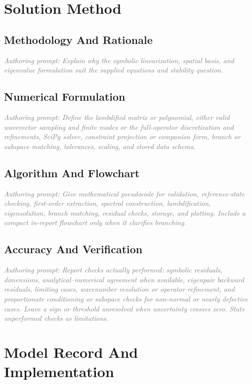 \documentclass[11pt]{article}
\newcommand{\authorprompt}[1]{\textcolor{gray}{\emph{Authoring prompt: #1}}}
\begin{document}
\section{Solution Method}

\subsection{Methodology And Rationale}

\authorprompt{Explain why the symbolic linearization, spatial basis, and eigenvalue formulation suit the supplied equations and stability question.}

\subsection{Numerical Formulation}

\authorprompt{Define the lambdified matrix or polynomial, either valid wavevector sampling and finite modes or the full-operator discretization and refinements, SciPy solver, constraint projection or companion form, branch or subspace matching, tolerances, scaling, and stored data schema.}

\subsection{Algorithm And Flowchart}

\authorprompt{Give mathematical pseudocode for validation, reference-state checking, first-order extraction, spectral construction, lambdification, eigensolution, branch matching, residual checks, storage, and plotting. Include a compact in-report flowchart only when it clarifies branching.}

\subsection{Accuracy And Verification}

\authorprompt{Report checks actually performed: symbolic residuals, dimensions, analytical--numerical agreement when available, eigenpair backward residuals, limiting cases, wavenumber resolution or operator refinement, and proportionate conditioning or subspace checks for non-normal or nearly defective cases. Leave a sign or threshold unresolved when uncertainty crosses zero. State unperformed checks as limitations.}

\section{Model Record And Implementation}
\end{document}
